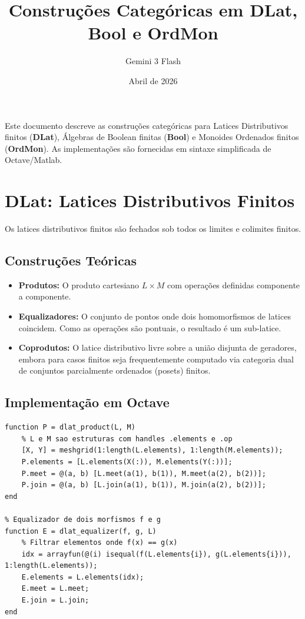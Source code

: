 \documentclass{article}
\title{Construções Categóricas em DLat, Bool e OrdMon}
\author{Gemini 3 Flash}
\date{Abril de 2026}
\begin{document}
\maketitle

Este documento descreve as construções categóricas para Latices Distributivos finitos (\textbf{DLat}), Álgebras de Boolean finitas (\textbf{Bool}) e Monoides Ordenados finitos (\textbf{OrdMon}). As implementações são fornecidas em sintaxe simplificada de Octave/Matlab.

\newpage

\section{DLat: Latices Distributivos Finitos}

Os latices distributivos finitos são fechados sob todos os limites e colimites finitos.

\subsection{Construções Teóricas}
\begin{itemize}
    \item \textbf{Produtos:} O produto cartesiano $L \times M$ com operações definidas componente a componente.
    \item \textbf{Equalizadores:} O conjunto de pontos onde dois homomorfismos de latices coincidem. Como as operações são pontuais, o resultado é um sub-latice.
    \item \textbf{Coprodutos:} O latice distributivo livre sobre a união disjunta de geradores, embora para casos finitos seja frequentemente computado via categoria dual de conjuntos parcialmente ordenados (posets) finitos.
\end{itemize}

\subsection{Implementação em Octave}
\begin{lstlisting}[caption={Construções DLat}]
% Produto de dois latices
function P = dlat_product(L, M)
    % L e M sao estruturas com handles .elements e .op
    [X, Y] = meshgrid(1:length(L.elements), 1:length(M.elements));
    P.elements = [L.elements(X(:)), M.elements(Y(:))];
    P.meet = @(a, b) [L.meet(a(1), b(1)), M.meet(a(2), b(2))];
    P.join = @(a, b) [L.join(a(1), b(1)), M.join(a(2), b(2))];
end

% Equalizador de dois morfismos f e g
function E = dlat_equalizer(f, g, L)
    % Filtrar elementos onde f(x) == g(x)
    idx = arrayfun(@(i) isequal(f(L.elements{i}), g(L.elements{i})), 1:length(L.elements));
    E.elements = L.elements(idx);
    E.meet = L.meet;
    E.join = L.join;
end
\end{lstlisting}
\end{document}
